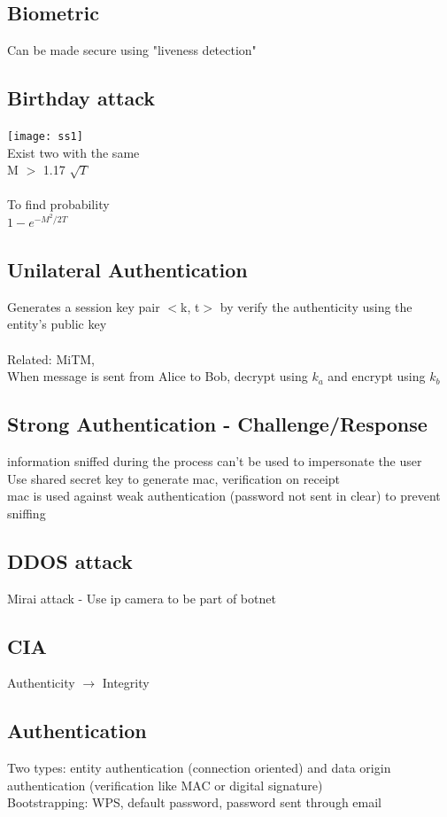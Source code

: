 \documentclass[11pt]{article}
\begin{document}
\begin{multicols*}{3}
\subsection*{Biometric}
Can be made secure using "liveness detection"
\subsection*{Birthday attack}
\texttt{[image: ss1]}
\\
Exist two with the same\\
M $>$ 1.17 $\sqrt{T}$
\\\\
To find probability\\
$1 - e^{-M^{2}/2T}$
\subsection*{Unilateral Authentication}
Generates a session key pair $<$k, t$>$ by verify the authenticity using the entity's public key\\\\
Related: MiTM,\\
When message is sent from Alice to Bob, decrypt using $k_{a}$ and encrypt using $k_{b}$\\
\subsection*{Strong Authentication - Challenge/Response}
 information sniffed during the process can’t be 
used to impersonate the user \\
Use shared secret key to generate mac, verification on receipt\\
mac is used against weak authentication (password not sent in clear) to prevent sniffing
\subsection*{DDOS attack}
Mirai attack - Use ip camera to be part of botnet
\subsection*{CIA}
Authenticity $\rightarrow$ Integrity
\subsection*{Authentication}
Two types: entity authentication (connection oriented) and data origin authentication (verification like MAC or digital signature)
\\
Bootstrapping: WPS, default password, password sent through email

\end{multicols*}
\end{document}
